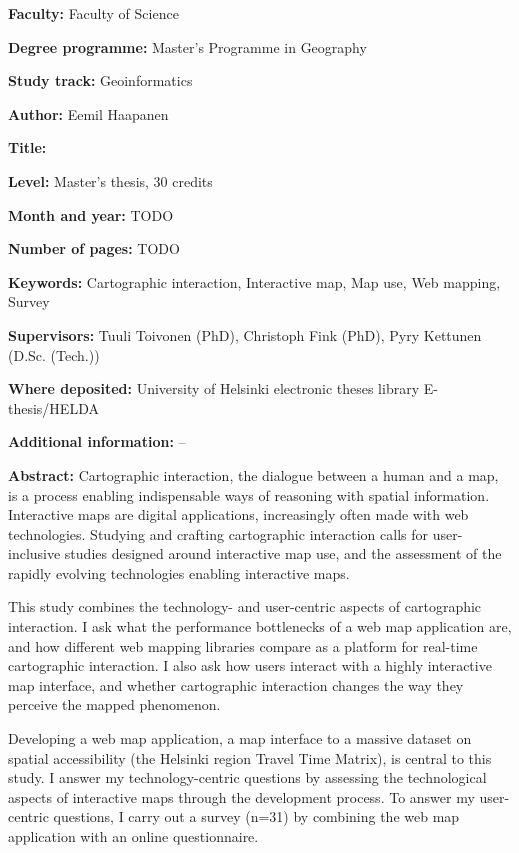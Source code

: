 \begin{spacing}{1}
\setlength{\parskip}{4pt}

\textbf{Faculty:} Faculty of Science

\textbf{Degree programme:} Master's Programme in Geography

\textbf{Study track:} Geoinformatics

\textbf{Author:} Eemil Haapanen

\textbf{Title:} \mytitle

\textbf{Level:} Master's thesis, 30 credits

\textbf{Month and year:} TODO

\textbf{Number of pages:} TODO

\textbf{Keywords:} Cartographic interaction, Interactive map, Map use, Web mapping, Survey

\textbf{Supervisors:} Tuuli Toivonen (PhD), Christoph Fink (PhD), Pyry Kettunen (D.Sc. (Tech.))

\textbf{Where deposited:} University of Helsinki electronic theses library E-thesis/HELDA

\textbf{Additional information:} --

\textbf{Abstract:} Cartographic interaction, the dialogue between a human and a map, is
a process enabling indispensable ways of reasoning with spatial information.
Interactive maps are digital applications,
increasingly often made with web technologies.
Studying and crafting cartographic interaction calls for
user-inclusive studies designed around interactive map use,
and the assessment of the rapidly evolving technologies enabling interactive maps.

This study combines the technology- and user-centric aspects of cartographic interaction.
I ask what the performance bottlenecks of a web map application are,
and how different web mapping libraries compare as a platform for real-time cartographic interaction.
I also ask how users interact with a highly interactive map interface,
and whether cartographic interaction changes the way they perceive the mapped phenomenon.

Developing a web map application,
a map interface to a massive dataset on spatial accessibility (the Helsinki region Travel Time Matrix),
is central to this study.
I answer my technology-centric questions by assessing the technological aspects of interactive maps
through the development process.
To answer my user-centric questions,
I carry out a survey (n=31) by combining the web map application with an online questionnaire.


\end{spacing}
